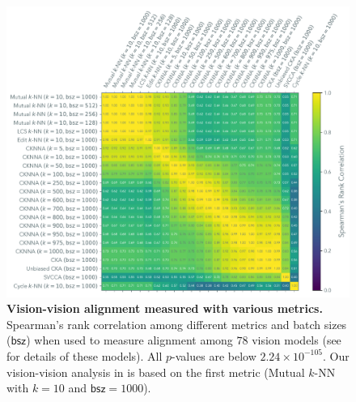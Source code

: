 \begin{figure}[hbtp]
    \centering
    \includegraphics[width=1\linewidth]{figures/vision_metrics_rankr.pdf}
    \caption{\textbf{Vision-vision alignment measured with various metrics.} Spearman's rank correlation among different metrics and batch sizes ($\mathsf{bsz}$) when used to measure alignment among $78$ vision models (see  for details of these models). All $p$-values are below $2.24\times 10^{-105}$. Our vision-vision analysis in  is based on the first metric (Mutual $k$-NN with $k=10$ and $\mathsf{bsz}=1000$).}
    \label{fig:app-same-modal-rankr}
\end{figure}


